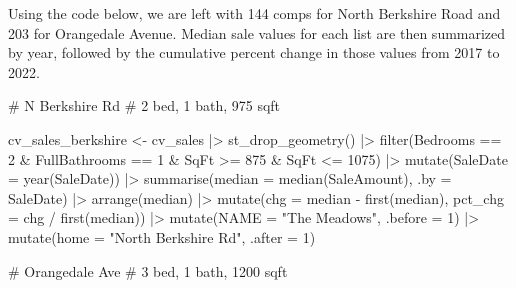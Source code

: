 \documentclass[
  letterpaper,
  DIV=11,
  numbers=noendperiod]{scrartcl}
\newenvironment{Shaded}{\begin{snugshade}}{\end{snugshade}}
\newcommand{\AttributeTok}[1]{\textcolor[rgb]{0.40,0.45,0.13}{#1}}
\newcommand{\CommentTok}[1]{\textcolor[rgb]{0.37,0.37,0.37}{#1}}
\newcommand{\DecValTok}[1]{\textcolor[rgb]{0.68,0.00,0.00}{#1}}
\newcommand{\FunctionTok}[1]{\textcolor[rgb]{0.28,0.35,0.67}{#1}}
\newcommand{\NormalTok}[1]{\textcolor[rgb]{0.00,0.23,0.31}{#1}}
\newcommand{\OtherTok}[1]{\textcolor[rgb]{0.00,0.23,0.31}{#1}}
\newcommand{\SpecialCharTok}[1]{\textcolor[rgb]{0.37,0.37,0.37}{#1}}
\newcommand{\StringTok}[1]{\textcolor[rgb]{0.13,0.47,0.30}{#1}}
\begin{document}
Using the code below, we are left with 144 comps for North Berkshire
Road and 203 for Orangedale Avenue. Median sale values for each list are
then summarized by year, followed by the cumulative percent change in
those values from 2017 to 2022.

\begin{Shaded}
\begin{Highlighting}[]
\CommentTok{\# N Berkshire Rd}
\CommentTok{\# 2 bed, 1 bath, 975 sqft}

\NormalTok{cv\_sales\_berkshire }\OtherTok{\textless{}{-}}\NormalTok{ cv\_sales }\SpecialCharTok{|\textgreater{}} 
  \FunctionTok{st\_drop\_geometry}\NormalTok{() }\SpecialCharTok{|\textgreater{}} 
  \FunctionTok{filter}\NormalTok{(Bedrooms }\SpecialCharTok{==} \DecValTok{2} \SpecialCharTok{\&}\NormalTok{ FullBathrooms }\SpecialCharTok{==} \DecValTok{1} \SpecialCharTok{\&}
\NormalTok{           SqFt }\SpecialCharTok{\textgreater{}=} \DecValTok{875} \SpecialCharTok{\&}\NormalTok{ SqFt }\SpecialCharTok{\textless{}=} \DecValTok{1075}\NormalTok{) }\SpecialCharTok{|\textgreater{}} 
  \FunctionTok{mutate}\NormalTok{(}\AttributeTok{SaleDate =} \FunctionTok{year}\NormalTok{(SaleDate)) }\SpecialCharTok{|\textgreater{}} 
  \FunctionTok{summarise}\NormalTok{(}\AttributeTok{median =} \FunctionTok{median}\NormalTok{(SaleAmount), }\AttributeTok{.by =}\NormalTok{ SaleDate) }\SpecialCharTok{|\textgreater{}} 
  \FunctionTok{arrange}\NormalTok{(median) }\SpecialCharTok{|\textgreater{}} 
  \FunctionTok{mutate}\NormalTok{(}\AttributeTok{chg =}\NormalTok{ median }\SpecialCharTok{{-}} \FunctionTok{first}\NormalTok{(median),}
         \AttributeTok{pct\_chg =}\NormalTok{ chg }\SpecialCharTok{/} \FunctionTok{first}\NormalTok{(median)) }\SpecialCharTok{|\textgreater{}} 
  \FunctionTok{mutate}\NormalTok{(}\AttributeTok{NAME =} \StringTok{"The Meadows"}\NormalTok{, }\AttributeTok{.before =} \DecValTok{1}\NormalTok{) }\SpecialCharTok{|\textgreater{}} 
  \FunctionTok{mutate}\NormalTok{(}\AttributeTok{home =} \StringTok{"North Berkshire Rd"}\NormalTok{, }\AttributeTok{.after =} \DecValTok{1}\NormalTok{)}

\CommentTok{\# Orangedale Ave}
\CommentTok{\# 3 bed, 1 bath, 1200 sqft}


\end{Highlighting}
\end{Shaded}
\end{document}
